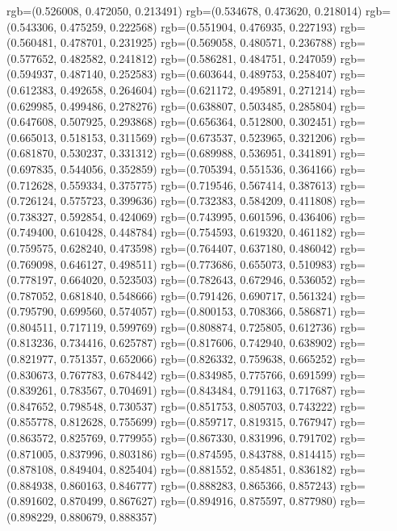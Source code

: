 {{{					rgb=(0.526008, 0.472050, 0.213491)
					rgb=(0.534678, 0.473620, 0.218014)
					rgb=(0.543306, 0.475259, 0.222568)
					rgb=(0.551904, 0.476935, 0.227193)
					rgb=(0.560481, 0.478701, 0.231925)
					rgb=(0.569058, 0.480571, 0.236788)
					rgb=(0.577652, 0.482582, 0.241812)
					rgb=(0.586281, 0.484751, 0.247059)
					rgb=(0.594937, 0.487140, 0.252583)
					rgb=(0.603644, 0.489753, 0.258407)
					rgb=(0.612383, 0.492658, 0.264604)
					rgb=(0.621172, 0.495891, 0.271214)
					rgb=(0.629985, 0.499486, 0.278276)
					rgb=(0.638807, 0.503485, 0.285804)
					rgb=(0.647608, 0.507925, 0.293868)
					rgb=(0.656364, 0.512800, 0.302451)
					rgb=(0.665013, 0.518153, 0.311569)
					rgb=(0.673537, 0.523965, 0.321206)
					rgb=(0.681870, 0.530237, 0.331312)
					rgb=(0.689988, 0.536951, 0.341891)
					rgb=(0.697835, 0.544056, 0.352859)
					rgb=(0.705394, 0.551536, 0.364166)
					rgb=(0.712628, 0.559334, 0.375775)
					rgb=(0.719546, 0.567414, 0.387613)
					rgb=(0.726124, 0.575723, 0.399636)
					rgb=(0.732383, 0.584209, 0.411808)
					rgb=(0.738327, 0.592854, 0.424069)
					rgb=(0.743995, 0.601596, 0.436406)
					rgb=(0.749400, 0.610428, 0.448784)
					rgb=(0.754593, 0.619320, 0.461182)
					rgb=(0.759575, 0.628240, 0.473598)
					rgb=(0.764407, 0.637180, 0.486042)
					rgb=(0.769098, 0.646127, 0.498511)
					rgb=(0.773686, 0.655073, 0.510983)
					rgb=(0.778197, 0.664020, 0.523503)
					rgb=(0.782643, 0.672946, 0.536052)
					rgb=(0.787052, 0.681840, 0.548666)
					rgb=(0.791426, 0.690717, 0.561324)
					rgb=(0.795790, 0.699560, 0.574057)
					rgb=(0.800153, 0.708366, 0.586871)
					rgb=(0.804511, 0.717119, 0.599769)
					rgb=(0.808874, 0.725805, 0.612736)
					rgb=(0.813236, 0.734416, 0.625787)
					rgb=(0.817606, 0.742940, 0.638902)
					rgb=(0.821977, 0.751357, 0.652066)
					rgb=(0.826332, 0.759638, 0.665252)
					rgb=(0.830673, 0.767783, 0.678442)
					rgb=(0.834985, 0.775766, 0.691599)
					rgb=(0.839261, 0.783567, 0.704691)
					rgb=(0.843484, 0.791163, 0.717687)
					rgb=(0.847652, 0.798548, 0.730537)
					rgb=(0.851753, 0.805703, 0.743222)
					rgb=(0.855778, 0.812628, 0.755699)
					rgb=(0.859717, 0.819315, 0.767947)
					rgb=(0.863572, 0.825769, 0.779955)
					rgb=(0.867330, 0.831996, 0.791702)
					rgb=(0.871005, 0.837996, 0.803186)
					rgb=(0.874595, 0.843788, 0.814415)
					rgb=(0.878108, 0.849404, 0.825404)
					rgb=(0.881552, 0.854851, 0.836182)
					rgb=(0.884938, 0.860163, 0.846777)
					rgb=(0.888283, 0.865366, 0.857243)
					rgb=(0.891602, 0.870499, 0.867627)
					rgb=(0.894916, 0.875597, 0.877980)
					rgb=(0.898229, 0.880679, 0.888357)
}}}
